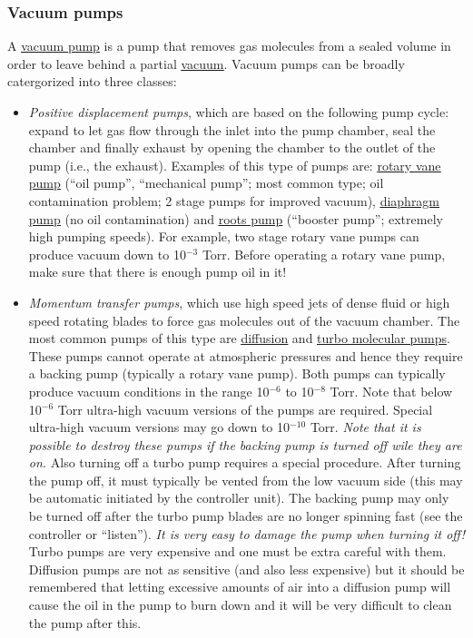 \documentclass[byrevtex,amssymb,aps,pra,floatfix,letterpaper]{revtex4}
\begin{document}
\subsubsection{Vacuum pumps}

A \href{http://en.wikipedia.org/wiki/Vacuum_pump}{\underline{vacuum pump}} is a pump that removes gas molecules from a sealed volume in order to leave behind a partial \href{http://en.wikipedia.org/wiki/Vacuum}{\underline{vacuum}}. Vacuum pumps can be broadly catergorized into three classes:

\begin{itemize}
\item \textit{Positive displacement pumps}, which are based on the following pump cycle: expand to let gas flow through the inlet into the pump chamber, seal the chamber and finally exhaust by opening the chamber to the outlet of the pump (i.e., the exhaust). Examples of this type of pumps are: \href{http://en.wikipedia.org/wiki/Rotary_vane_pump}{\underline{rotary vane pump}} (``oil pump'', ``mechanical pump''; most common type; oil contamination problem; 2 stage pumps for improved vacuum), \href{http://en.wikipedia.org/wiki/Diaphragm_pump}{\underline{diaphragm pump}} (no oil contamination) and \href{http://en.wikipedia.org/wiki/Roots_blower}{\underline{roots pump}} (``booster pump''; extremely high pumping speeds). For example, two stage rotary vane pumps can produce vacuum down to 10$^{-3}$ Torr. Before operating a rotary vane pump, make sure that there is enough pump oil in it!

\item \textit{Momentum transfer pumps}, which use high speed jets of dense fluid or high speed rotating blades to force gas molecules out of the vacuum chamber. The most common pumps of this type are \href{http://en.wikipedia.org/wiki/Diffusion_pump}{\underline{diffusion}} and \href{http://en.wikipedia.org/wiki/Turbomolecular_pump}{\underline{turbo molecular pumps}}. These pumps cannot operate at atmospheric pressures and hence they require a backing pump (typically a rotary vane pump). Both pumps can typically produce vacuum conditions in the range 10$^{-6}$ to 10$^{-8}$ Torr. Note that below 10$^{-6}$ Torr ultra-high vacuum versions of the pumps are required. Special ultra-high vacuum versions may go down to 10$^{-10}$ Torr. \textit{Note that it is possible to destroy these pumps if the backing pump is turned off wile they are on.} Also turning off a turbo pump requires a special procedure. After turning the pump off, it must typically be vented from the low vacuum side (this may be automatic initiated by the controller unit). The backing pump may only be turned off after the turbo pump blades are no longer spinning fast (see the controller or ``listen''). \textit{It is very easy to damage the pump when turning it off!} Turbo pumps are very expensive and one must be extra careful with them. Diffusion pumps are not as sensitive (and also less expensive) but it should be remembered that letting excessive amounts of air into a diffusion pump will cause the oil in the pump to burn down and it will be very difficult to clean the pump after this.


\end{itemize}
\end{document}
